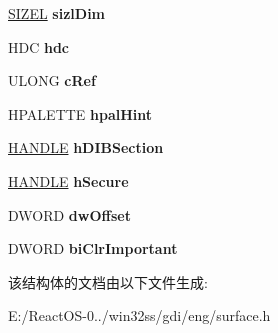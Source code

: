 \begin{DoxyCompactItemize}
\begin{tabbing}
\end{tabbing}\item 
\mbox{\label{struct___s_u_r_f_a_c_e_a4ce05934402edbbc38108b4fd2de6620}} 
\hyperlink{structtag_s_i_z_e}{S\+I\+Z\+EL} {\bfseries sizl\+Dim}
\item 
\mbox{\label{struct___s_u_r_f_a_c_e_a83f9dd3b16d2fcb6661e252908a4c4dd}} 
H\+DC {\bfseries hdc}
\item 
\mbox{\label{struct___s_u_r_f_a_c_e_a0e44204dc31658ebe959bd5b39cd4c49}} 
U\+L\+O\+NG {\bfseries c\+Ref}
\item 
\mbox{\label{struct___s_u_r_f_a_c_e_aa0c58be309d75a10ea52388970222a21}} 
H\+P\+A\+L\+E\+T\+TE {\bfseries hpal\+Hint}
\item 
\mbox{\label{struct___s_u_r_f_a_c_e_a499e2d08fd571f51376320d994b6666a}} 
\hyperlink{interfacevoid}{H\+A\+N\+D\+LE} {\bfseries h\+D\+I\+B\+Section}
\item 
\mbox{\label{struct___s_u_r_f_a_c_e_a938abaa3adceb0dc3c26219c7f3be824}} 
\hyperlink{interfacevoid}{H\+A\+N\+D\+LE} {\bfseries h\+Secure}
\item 
\mbox{\label{struct___s_u_r_f_a_c_e_a9d5757d6a99d4e522e57cc20a95c9edf}} 
D\+W\+O\+RD {\bfseries dw\+Offset}
\item 
\mbox{\label{struct___s_u_r_f_a_c_e_abe73cf8ced325b104ce9b31771fd1c7f}} 
D\+W\+O\+RD {\bfseries bi\+Clr\+Important}
\end{DoxyCompactItemize}


该结构体的文档由以下文件生成\+:\begin{DoxyCompactItemize}
\item 
E\+:/\+React\+O\+S-\/0../win32ss/gdi/eng/surface.\+h\end{DoxyCompactItemize}
